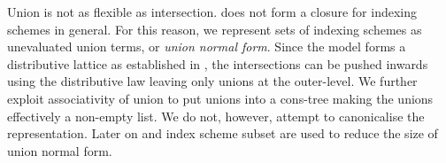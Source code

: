 Union is not as flexible as
intersection.  does not form a closure for
indexing schemes in general. For this reason, we represent sets of
indexing schemes as unevaluated union terms, or \emph{union normal
  form}.  Since the model forms a distributive lattice as established
in , the intersections can be pushed inwards
using the distributive law leaving only unions at the outer-level. We
further exploit associativity of union to put unions into a cons-tree
making the unions effectively a non-empty list.  We do not, however,
attempt to canonicalise the representation. Later on
 and index scheme subset are used to reduce the
size of union normal form.

